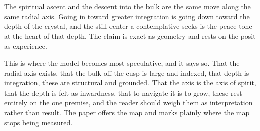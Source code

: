 \begin{principle}
The spiritual ascent and the descent into the bulk are the same move along the same radial axis. Going in toward greater integration is going down toward the depth of the crystal, and the still center a contemplative seeks is the peace tone at the heart of that depth. The claim is exact as geometry and rests on the posit as experience.
\end{principle}

This is where the model becomes most speculative, and it says so. That the radial axis exists, that the bulk off the cusp is large and indexed, that depth is integration, these are structural and grounded. That the axis is the axis of spirit, that the depth is felt as inwardness, that to navigate it is to grow, these rest entirely on the one premise, and the reader should weigh them as interpretation rather than result. The paper offers the map and marks plainly where the map stops being measured.

